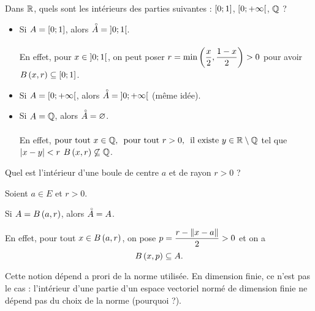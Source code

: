 \begin{exo}
Dans \(\mathbb{R}\), quels sont les intérieurs des parties suivantes : \(\left[0;1\right]\), \(\left[0;+\infty\right[\), \(\mathbb{Q}\) ?
\end{exo}

\begin{corr}
\begin{itemize}
    \item Si \(A=\left[0;1\right]\), alors \(\accentset{\circ}{A}=\left]0;1\right[\). \\\\ En effet, pour \(x\in\left]0;1\right[\), on peut poser \(r=\min\left(\dfrac{x}{2},\dfrac{1-x}{2}\right)>0\) pour avoir \(\bouleo{x}{r}\subset\intervii{0}{1}\). \\
    \item Si \(A=\left[0;+\infty\right[\), alors \(\accentset{\circ}{A}=\left]0;+\infty\right[\) (même idée). \\
    \item Si \(A=\mathbb{Q}\), alors \(\accentset{\circ}{A}=\varnothing\). \\\\ En effet, \(\quantifs{\tpt x\in\Q;\tpt r>0}\text{il existe }y\in\R\excluant\Q\) tel que \(\left\lvert x-y\right\rvert<r\) \ie \(\bouleo{x}{r}\not\subset\Q\).
\end{itemize}
\end{corr}

\begin{exo}
Quel est l'intérieur d'une boule de centre \(a\) et de rayon \(r>0\) ?
\end{exo}

\begin{corr}
Soient \(a\in E\) et \(r>0\).

Si \(A=\bouleo{a}{r}\), alors \(\accentset{\circ}{A}=A\).

En effet, pour tout \(x\in\bouleo{a}{r}\), on pose \(p=\dfrac{r-\norme{x-a}}{2}>0\) et on a \[\bouleo{x}{p}\subset A.\]
\end{corr}

\begin{rem}
Cette notion dépend a prori de la norme utilisée. En dimension finie, ce n'est pas le cas : l'intérieur d'une partie d'un espace vectoriel normé de dimension finie ne dépend pas du choix de la norme (pourquoi ?).
\end{rem}

